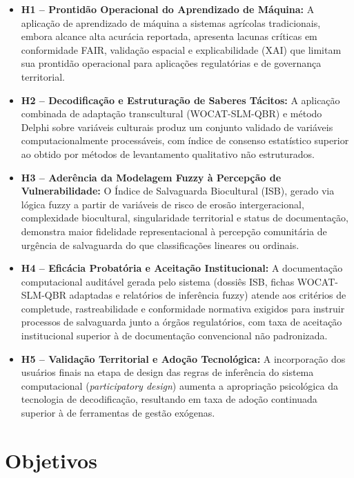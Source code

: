 \begin{itemize}

\item \textbf{H1 – Prontidão Operacional do Aprendizado de Máquina:}
A aplicação de aprendizado de máquina a sistemas agrícolas tradicionais, embora alcance alta acurácia reportada, apresenta lacunas críticas em conformidade FAIR, validação espacial e explicabilidade (XAI) que limitam sua prontidão operacional para aplicações regulatórias e de governança territorial.

\item \textbf{H2 – Decodificação e Estruturação de Saberes Tácitos:}
A aplicação combinada de adaptação transcultural (WOCAT-SLM-QBR) e método Delphi sobre variáveis culturais produz um conjunto validado de variáveis computacionalmente processáveis, com índice de consenso estatístico superior ao obtido por métodos de levantamento qualitativo não estruturados.

\item \textbf{H3 – Aderência da Modelagem Fuzzy à Percepção de Vulnerabilidade:}
O Índice de Salvaguarda Biocultural (ISB), gerado via lógica fuzzy a partir de variáveis de risco de erosão intergeracional, complexidade biocultural, singularidade territorial e status de documentação, demonstra maior fidelidade representacional à percepção comunitária de urgência de salvaguarda do que classificações lineares ou ordinais.

\item \textbf{H4 – Eficácia Probatória e Aceitação Institucional:}
A documentação computacional auditável gerada pelo sistema (dossiês ISB, fichas WOCAT-SLM-QBR adaptadas e relatórios de inferência fuzzy) atende aos critérios de completude, rastreabilidade e conformidade normativa exigidos para instruir processos de salvaguarda junto a órgãos regulatórios, com taxa de aceitação institucional superior à de documentação convencional não padronizada.

\item \textbf{H5 – Validação Territorial e Adoção Tecnológica:}
A incorporação dos usuários finais na etapa de design das regras de inferência do sistema computacional (\textit{participatory design}) aumenta a apropriação psicológica da tecnologia de decodificação, resultando em taxa de adoção continuada superior à de ferramentas de gestão exógenas.

\end{itemize}



\section{Objetivos}

